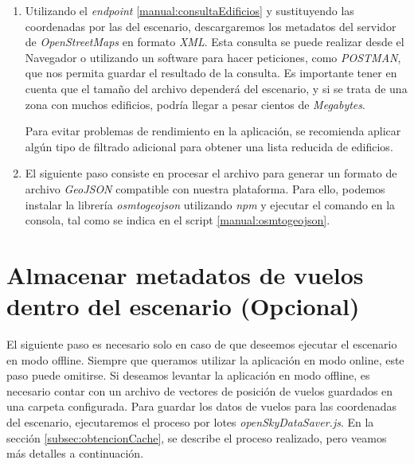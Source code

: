 \documentclass[a4paper, 11pt]{book}
\begin{document}
\begin{enumerate}
    \item Utilizando el \emph{endpoint} \ref{manual:consultaEdificios} y sustituyendo las coordenadas por las del escenario, descargaremos los metadatos del servidor de \emph{OpenStreetMaps} en formato \emph{XML}. Esta consulta se puede realizar desde el Navegador o utilizando un software para hacer peticiones, como \emph{POSTMAN}, que nos permita guardar el resultado de la consulta. Es importante tener en cuenta que el tamaño del archivo dependerá del escenario, y si se trata de una zona con muchos edificios, podría llegar a pesar cientos de \emph{Megabytes}. 
    
    Para evitar problemas de rendimiento en la aplicación, se recomienda aplicar algún tipo de filtrado adicional para obtener una lista reducida de edificios.
    \item El siguiente paso consiste en procesar el archivo para generar un formato de archivo \emph{GeoJSON} compatible con nuestra plataforma. Para ello, podemos instalar la librería \emph{osmtogeojson} utilizando \emph{npm} y ejecutar el comando en la consola, tal como se indica en el script \ref{manual:osmtogeojson}.
\end{enumerate}
\section{Almacenar metadatos de vuelos dentro del escenario (Opcional)}
El siguiente paso es necesario solo en caso de que deseemos ejecutar el escenario en modo offline. Siempre que queramos utilizar la aplicación en modo online, este paso puede omitirse.
Si deseamos levantar la aplicación en modo offline, es necesario contar con un archivo de vectores de posición de vuelos guardados en una carpeta configurada. Para guardar los datos de vuelos para las coordenadas del escenario, ejecutaremos el proceso por lotes \emph{openSkyDataSaver.js}. En la sección \ref{subsec:obtencionCache}, se describe el proceso realizado, pero veamos más detalles a continuación.
\end{document}
